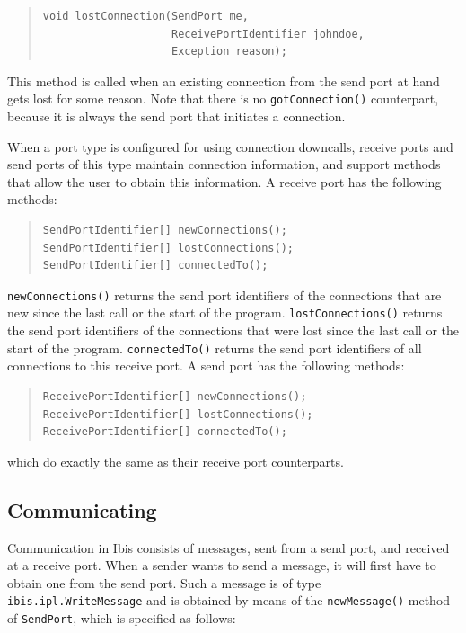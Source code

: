 \documentclass[10pt]{article}
\newcommand{\mysubsection}[1]{\subsection{#1}\label{#1}}
\begin{document}
\begin{quote}
\begin{verbatim}
void lostConnection(SendPort me,
                    ReceivePortIdentifier johndoe,
                    Exception reason);
\end{verbatim}
\end{quote}
\noindent 
This method is called when an existing connection from the send port at
hand gets lost for some reason. Note that there is no \texttt{gotConnection()}
counterpart, because it is always the send port that initiates a connection.

When a port type is configured for using connection downcalls, receive ports
and send ports of this type maintain connection information, and support
methods that allow the user to obtain this information.
A receive port has the following methods:

\begin{quote}
\begin{verbatim}
SendPortIdentifier[] newConnections();
SendPortIdentifier[] lostConnections();
SendPortIdentifier[] connectedTo();
\end{verbatim}
\end{quote}

\texttt{newConnections()} returns the send port identifiers of the connections
that are new since the last call or the start of the program.
\texttt{lostConnections()} returns the send port identifiers of the connections
that were lost since the last call or the start of the program.
\texttt{connectedTo()} returns the send port identifiers of all connections
to this receive port.
A send port has the following methods:

\begin{quote}
\begin{verbatim}
ReceivePortIdentifier[] newConnections();
ReceivePortIdentifier[] lostConnections();
ReceivePortIdentifier[] connectedTo();
\end{verbatim}
\end{quote}
\noindent
which do exactly the same as their receive port counterparts.

\mysubsection{Communicating}

Communication in Ibis
consists of messages, sent from a send port, and received at a
receive port. When a sender wants to send a message, it will first
have to obtain one from the send port. Such a message is of
type \texttt{ibis.ipl.WriteMessage} and is obtained by means of
the \texttt{newMessage()} method of \texttt{SendPort}, which is specified
as follows:
\end{document}
